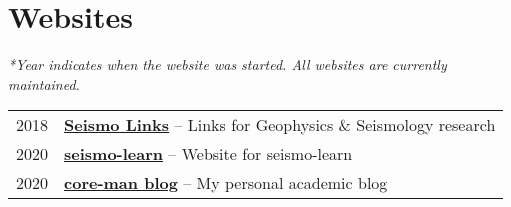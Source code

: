 \section*{Websites}

\textit{*Year indicates when the website was started. All websites are currently maintained.}

\begin{tabular}{p{} p{}}
2018 &	\textbf{\href{https://seismo-learn.org/links/}{Seismo Links}} -- Links for Geophysics \& Seismology research \\
2020 &	\textbf{\href{https://seismo-learn.org/}{seismo-learn}} -- Website for seismo-learn \\
2020 &	\textbf{\href{https://core-man.github.io/blog/}{core-man blog}} -- My personal academic blog \\
\end{tabular}
